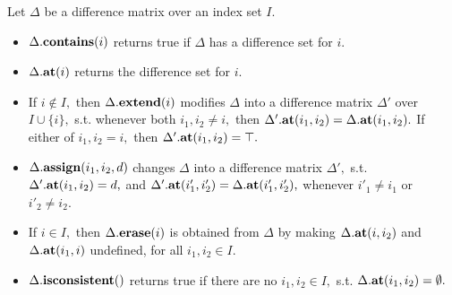 \begin{definition}
        \label{Def_operations_on_difference_matrix}
   Let $ \Delta $ be a difference matrix over an index set $ I. $
   \begin{itemize}
   \item
      $ \Delta. {\bf contains}(i) $ returns true if
      $ \Delta $ has a difference set for $ i. $ 
   \item
      $ \Delta. {\bf at}(i) $ returns the difference
      set for $ i. $ 
   \item
      If $ i \not \in I, $ then
      $ \Delta. {\bf extend}(i) $ modifies $ \Delta $ into
      a difference matrix $ \Delta' $ over $ I \cup \{ i \}, $ s.t.
      whenever both $ i_1, i_2 \not = i, $ then $ \Delta'. {\bf at}(i_1,i_2) =
      \Delta. {\bf at}( i_1,i_2). $
      If either of $ i_1, i_2 = i, $ then $ \Delta'.{\bf at}(i_1,i_2) = \top. $
   \item
      $ \Delta. {\bf assign}( i_1, i_2, d ) $ changes $ \Delta $
      into a difference matrix $ \Delta', $ s.t.
      $ \Delta'.{\bf at}(i_1,i_2) = d, $ and
      $ \Delta'.{\bf at}(i'_1,i'_2) = \Delta.{\bf at}(i'_1,i'_2), $
      whenever $ i'_1 \not = i_1 $ or $ i'_2 \not = i_2. $
   \item
      If $ i \in I, $ then
      $ \Delta. {\bf erase}(i) $ is obtained from $ \Delta $
      by making $ \Delta.{\bf at}(i,i_2) $ and $ \Delta.{\bf at}(i_1,i) $
      undefined, for all $ i_1,i_2 \in I. $ 
   \item
      $ \Delta. {\bf isconsistent}( ) $ returns true if
      there are no $ i_1, i_2 \in I, $ s.t.
      $ \Delta. {\bf at}(i_1,i_2) = \emptyset. $
   \end{itemize}
\end{definition}

